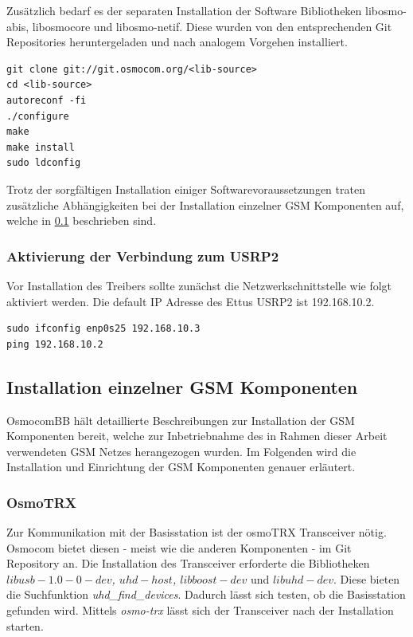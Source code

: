 Zusätzlich bedarf es der separaten Installation der Software Bibliotheken libosmo-abis, libosmocore und libosmo-netif. Diese wurden von den entsprechenden Git Repositories heruntergeladen und nach analogem Vorgehen installiert.

\begin{lstlisting}
git clone git://git.osmocom.org/<lib-source>
cd <lib-source>
autoreconf -fi
./configure
make
make install
sudo ldconfig
\end{lstlisting}

Trotz der sorgfältigen Installation einiger Softwarevoraussetzungen traten zusätzliche Abhängigkeiten bei der Installation einzelner GSM Komponenten auf, welche in \ref{GSM_Komp_Osmocom} beschrieben sind.

\subsubsection{Aktivierung der Verbindung zum USRP2}
Vor Installation des Treibers sollte zunächst die Netzwerkschnittstelle wie folgt aktiviert werden. Die default IP Adresse des Ettus USRP2 ist 192.168.10.2. 

\begin{lstlisting}
sudo ifconfig enp0s25 192.168.10.3
ping 192.168.10.2
\end{lstlisting}

\subsection{Installation einzelner GSM Komponenten}\label{GSM_Komp_Osmocom}
OsmocomBB hält detaillierte Beschreibungen zur Installation der GSM Komponenten bereit, welche zur Inbetriebnahme des in Rahmen dieser Arbeit verwendeten GSM Netzes herangezogen wurden. Im Folgenden wird die Installation und Einrichtung der GSM Komponenten genauer erläutert. 

\subsubsection{OsmoTRX}
Zur Kommunikation mit der Basisstation ist der osmoTRX Transceiver nötig. Osmocom bietet diesen - meist wie die anderen Komponenten - im Git Repository an. Die Installation des Transceiver erforderte die Bibliotheken \textit{$libusb-1.0-0-dev$, $uhd-host$, $libboost-dev$} und \textit{$libuhd-dev$}. Diese bieten die Suchfunktion \textit{uhd\_find\_devices}. Dadurch lässt sich testen, ob die Basisstation gefunden wird. Mittels \textit{osmo-trx} lässt sich der Transceiver nach der Installation starten.


